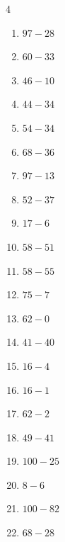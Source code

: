 \begin{multicols}{4}
\begin{enumerate}
  \item $97-28$
        \phantom{$=69$}

  \item $60-33$
        \phantom{$=27$}

  \item $46-10$
        \phantom{$=36$}

  \item $44-34$
        \phantom{$=10$}

  \item $54-34$
        \phantom{$=20$}

  \item $68-36$
        \phantom{$=32$}

  \item $97-13$
        \phantom{$=84$}

  \item $52-37$
        \phantom{$=15$}

  \item $17-6$
        \phantom{$=11$}

  \item $58-51$
        \phantom{$=7$}

  \item $58-55$
        \phantom{$=3$}

  \item $75-7$
        \phantom{$=68$}

  \item $62-0$
        \phantom{$=62$}

  \item $41-40$
        \phantom{$=1$}

  \item $16-4$
        \phantom{$=12$}

  \item $16-1$
        \phantom{$=15$}

  \item $62-2$
        \phantom{$=60$}

  \item $49-41$
        \phantom{$=8$}

  \item $100-25$
        \phantom{$=75$}

  \item $8-6$
        \phantom{$=2$}

  \item $100-82$
        \phantom{$=18$}

  \item $68-28$
        \phantom{$=40$}


\end{enumerate}
\end{multicols}
